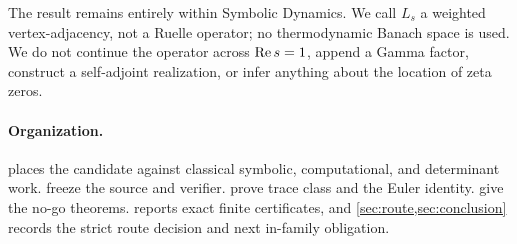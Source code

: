 The result remains entirely within Symbolic Dynamics.  We call $L_s$ a
weighted vertex-adjacency, not a Ruelle operator; no thermodynamic Banach
space is used.  We do not continue the operator across $\operatorname{Re} s=1$, append
a Gamma factor, construct a self-adjoint realization, or infer anything
about the location of zeta zeros.

\paragraph{Organization.}
 places the candidate against classical symbolic,
computational, and determinant work.   freeze the
source and verifier.   prove trace class and the
Euler identity.   give the no-go theorems.
 reports exact finite certificates, and
\cref{sec:route,sec:conclusion} records the strict route decision and next
in-family obligation.
